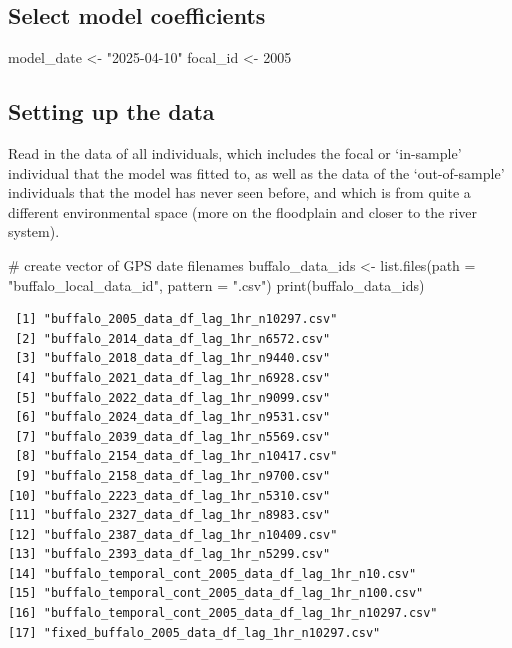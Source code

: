 \documentclass[
  letterpaper,
  DIV=11,
  numbers=noendperiod]{scrartcl}
\newenvironment{Shaded}{\begin{snugshade}}{\end{snugshade}}
\newcommand{\AttributeTok}[1]{\textcolor[rgb]{0.40,0.45,0.13}{#1}}
\newcommand{\CommentTok}[1]{\textcolor[rgb]{0.37,0.37,0.37}{#1}}
\newcommand{\DecValTok}[1]{\textcolor[rgb]{0.68,0.00,0.00}{#1}}
\newcommand{\FunctionTok}[1]{\textcolor[rgb]{0.28,0.35,0.67}{#1}}
\newcommand{\NormalTok}[1]{\textcolor[rgb]{0.00,0.23,0.31}{#1}}
\newcommand{\OtherTok}[1]{\textcolor[rgb]{0.00,0.23,0.31}{#1}}
\newcommand{\StringTok}[1]{\textcolor[rgb]{0.13,0.47,0.30}{#1}}
\begin{document}
\subsection{Select model coefficients}\label{select-model-coefficients}

\begin{Shaded}
\begin{Highlighting}[]
\NormalTok{model\_date }\OtherTok{\textless{}{-}} \StringTok{"2025{-}04{-}10"}
\NormalTok{focal\_id }\OtherTok{\textless{}{-}} \DecValTok{2005}
\end{Highlighting}
\end{Shaded}

\subsection{Setting up the data}\label{setting-up-the-data}

Read in the data of all individuals, which includes the focal or
`in-sample' individual that the model was fitted to, as well as the data
of the `out-of-sample' individuals that the model has never seen before,
and which is from quite a different environmental space (more on the
floodplain and closer to the river system).

\begin{Shaded}
\begin{Highlighting}[]
\CommentTok{\# create vector of GPS date filenames}
\NormalTok{buffalo\_data\_ids }\OtherTok{\textless{}{-}} \FunctionTok{list.files}\NormalTok{(}\AttributeTok{path =} \StringTok{"buffalo\_local\_data\_id"}\NormalTok{, }\AttributeTok{pattern =} \StringTok{".csv"}\NormalTok{) }
\FunctionTok{print}\NormalTok{(buffalo\_data\_ids)}
\end{Highlighting}
\end{Shaded}

\begin{verbatim}
 [1] "buffalo_2005_data_df_lag_1hr_n10297.csv"              
 [2] "buffalo_2014_data_df_lag_1hr_n6572.csv"               
 [3] "buffalo_2018_data_df_lag_1hr_n9440.csv"               
 [4] "buffalo_2021_data_df_lag_1hr_n6928.csv"               
 [5] "buffalo_2022_data_df_lag_1hr_n9099.csv"               
 [6] "buffalo_2024_data_df_lag_1hr_n9531.csv"               
 [7] "buffalo_2039_data_df_lag_1hr_n5569.csv"               
 [8] "buffalo_2154_data_df_lag_1hr_n10417.csv"              
 [9] "buffalo_2158_data_df_lag_1hr_n9700.csv"               
[10] "buffalo_2223_data_df_lag_1hr_n5310.csv"               
[11] "buffalo_2327_data_df_lag_1hr_n8983.csv"               
[12] "buffalo_2387_data_df_lag_1hr_n10409.csv"              
[13] "buffalo_2393_data_df_lag_1hr_n5299.csv"               
[14] "buffalo_temporal_cont_2005_data_df_lag_1hr_n10.csv"   
[15] "buffalo_temporal_cont_2005_data_df_lag_1hr_n100.csv"  
[16] "buffalo_temporal_cont_2005_data_df_lag_1hr_n10297.csv"
[17] "fixed_buffalo_2005_data_df_lag_1hr_n10297.csv"        
\end{verbatim}
\end{document}
